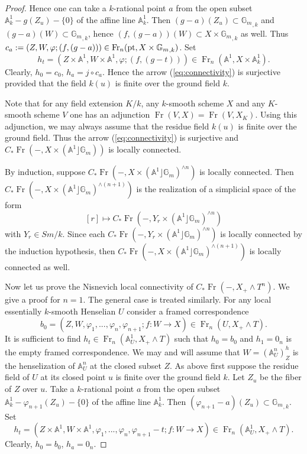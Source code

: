 \documentclass[a4paper,11pt,reqno]{amsart}
\begin{document}
\begin{proof}
Hence one can take a $k$-rational point $a$ from the open subset
${\mathbb{A}}^1_k-g(Z_u)- \{0\}$ of the affine line ${\mathbb{A}}^1_k$. Then $(g-a)(Z_u)
\subset {{\mathbb{G}_m}}_{,k}$ and $(g-a)(W)\subset {{\mathbb{G}_m}}_{,k}$, hence
$(f,(g-a))(W)\subset X\times {{\mathbb{G}_m}}_{,k}$ as well. Thus
$c_a:=(Z,W,{\varphi}; (f,(g - a)))\in {\operatorname{Fr}}_n({{\rm pt}},X\times {{\mathbb{G}_m}}_{,k})$. Set
$$h_t=(Z\times {\mathbb{A}}^1,W\times {\mathbb{A}}^1,{\varphi};  (f,(g - t)))\in {\operatorname{Fr}}_n({\mathbb{A}}^1,X\times {\mathbb{A}}^1_k).$$
Clearly, $h_0=c_0$, $h_{a}=j \circ c_a$. Hence the arrow
(\ref{eq:connectivity}) is surjective provided that the field $k(u)$
is finite over the ground field $k$.

Note that for any field extension $K/k$, any $k$-smooth scheme $X$
and any $K$-smooth scheme $V$ one has an adjunction
${\operatorname{Fr}}(V,X)={\operatorname{Fr}}(V,X_K)$. Using this adjunction, we may always assume
that the residue field $k(u)$ is finite over the ground field. Thus
the arrow (\ref{eq:connectivity}) is surjective and
$C_*{\operatorname{Fr}}(-,X\times ({\mathbb{A}}^1\rfloor\mathbb G_m))$ is locally connected.

By induction, suppose $C_*{\operatorname{Fr}}(-,X\times ({\mathbb{A}}^1\rfloor\mathbb
G_m)^{\wedge n})$ is locally connected. Then $C_*{\operatorname{Fr}}(-,X\times
({\mathbb{A}}^1\rfloor\mathbb G_m)^{\wedge(n+1)})$ is the realization of a
simplicial space of the form
   $$[r]\mapsto C_*{\operatorname{Fr}}(-,Y_r\times({\mathbb{A}}^1\rfloor\mathbb G_m)^{\wedge n})$$
with $Y_r\in Sm/k$. Since each $C_*{\operatorname{Fr}}(-,Y_r\times
({\mathbb{A}}^1\rfloor\mathbb G_m)^{\wedge n})$ is locally connected by the
induction hypothesis, then $C_*{\operatorname{Fr}}(-,X\times ({\mathbb{A}}^1\rfloor\mathbb
G_m)^{\wedge(n+1)})$ is locally connected as well.

Now let us prove the Nisnevich local connectivity of
$C_*{\operatorname{Fr}}(-,X_+\wedge T^n)$. We give a proof for $n=1$. The general
case is treated similarly. For any local essentially $k$-smooth
Henselian $U$ consider a framed correspondence
   $$b_0=(Z,W, {\varphi}_1,...,{\varphi}_n,{\varphi}_{n+1}; f:W\to X)\in {\operatorname{Fr}}_n(U,X_+\wedge T).$$
It is sufficient to find $h_t\in {\operatorname{Fr}}_n({\mathbb{A}}^1_U,X_+\wedge T)$ such
that $h_0=b_0$ and $h_{1}=0_n$ is the empty framed correspondence.
We may and will assume that $W=({\mathbb{A}}^n_U)^h_Z$ is the henselization of
${\mathbb{A}}^n_U$ at the closed subset $Z$. As above first suppose the
residue field of $U$ at its closed point $u$ is finite over the
ground field $k$. Let $Z_u$ be the fiber of $Z$ over $u$. Take a
$k$-rational point $a$ from the open subset ${\mathbb{A}}^1_k-{\varphi}_{n+1}(Z_u)-
\{0\}$ of the affine line ${\mathbb{A}}^1_k$. Then $({\varphi}_{n+1}-a)(Z_u)
\subset {{\mathbb{G}_m}}_{,k}$. Set
   $$h_t=(Z\times {\mathbb{A}}^1,W\times {\mathbb{A}}^1,{\varphi}_1,...,{\varphi}_{n},{\varphi}_{n+1}-t;f:W\to X)\in {\operatorname{Fr}}_n({\mathbb{A}}^1_U,X_+\wedge T).$$
Clearly, $h_0=b_0$, $h_{a}=0_n$.


\end{proof}
\end{document}
